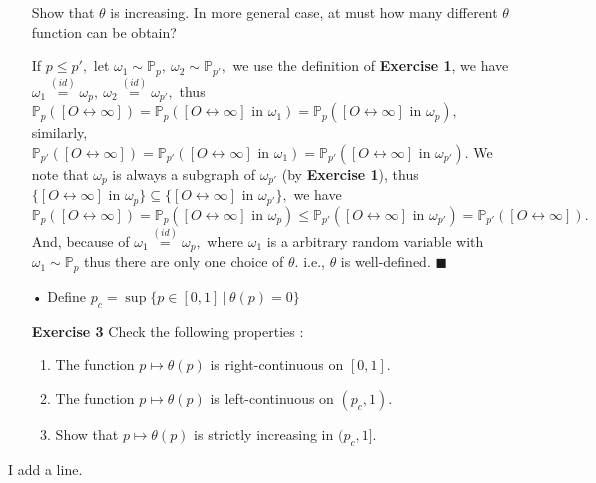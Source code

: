 \documentclass[12pt,a4paper]{article}
\newcommand{\SOL}{\fbox{ \tt s\parbox[b][2pt][c]{6pt}{o}\hspace*{-7pt} L:}}
\begin{document}
\begin{enumerate}
	Show that $\theta$ is increasing. In more general case, at must how many different $\theta$ function can be obtain?
	\item[\SOL] If $p\leq p',$ let $\omega_1\sim \mathbb{P}_p,\ \omega_2\sim \mathbb{P}_{p'},$ we use the definition of \textbf{Exercise 1}, we have\\ $\omega_1\overset{(id)}{=}\omega_p,\ \omega_2\overset{(id)}{=}\omega_{p'},$ thus $\mathbb{P}_p([O\leftrightarrow\infty])=\mathbb{P}_p([O\leftrightarrow\infty]\mbox{ in }\omega_1)=\mathbb{P}_p([O\leftrightarrow\infty]\mbox{ in }\omega_p),$ 
	\newpage
	similarly, $\mathbb{P}_{p'}([O\leftrightarrow\infty])=\mathbb{P}_{p'}([O\leftrightarrow\infty]\mbox{ in }\omega_1)=\mathbb{P}_{p'}([O\leftrightarrow\infty]\mbox{ in }\omega_{p'}).$ We note that $\omega_p$ is always a subgraph of $\omega_{p'}$ (by \textbf{Exercise 1}), thus $\{[O\leftrightarrow\infty]\mbox{ in }\omega_p\}\subseteq\{[O\leftrightarrow\infty]\mbox{ in }\omega_{p'}\},$ we have $\mathbb{P}_p([O\leftrightarrow\infty])=\mathbb{P}_p([O\leftrightarrow\infty]\mbox{ in }\omega_p)\leq \mathbb{P}_{p'}([O\leftrightarrow\infty]\mbox{ in }\omega_{p'})=\mathbb{P}_{p'}([O\leftrightarrow\infty]).$\\
	And, because of $\omega_1\overset{(id)}{=}\omega_p,$ where $\omega_1$ is a arbitrary random variable with $\omega_1\sim\mathbb{P}_p$ thus there are only one choice of $\theta.$ i.e., $\theta$ is well-defined. $\blacksquare$
	\item[•] Define $p_c=\sup\{p\in [0,1]\,|\,\theta(p)=0\}$
	\item[\textbf{Exercise 3}] Check the following properties : 
	\begin{enumerate}
		\item The function $p\mapsto\theta(p)$ is right-continuous on $[0,1].$
		\item The function $p\mapsto\theta(p)$ is left-continuous on $(p_c,1).$
		\item Show that $p\mapsto \theta(p)$ is strictly increasing in $(p_c,1].$
	\end{enumerate}
\end{enumerate}
 I add a line.
\end{document}
